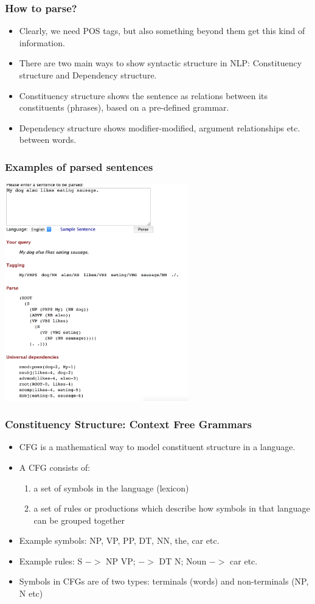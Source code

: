 \documentclass{beamer}
\begin{document}
\begin{frame}
\frametitle{How to parse?}
\begin{itemize}
\item Clearly, we need POS tags, but also something beyond them get this kind of information. 
\item There are two main ways to show syntactic structure in NLP: Constituency structure and Dependency structure. 
\item Constituency structure shows the sentence as relations between its constituents (phrases), based on a pre-defined grammar.
\item Dependency structure shows modifier-modified, argument relationships etc. between words. 
\end{itemize}
\end{frame}

\begin{frame}
\frametitle{Examples of parsed sentences}
\includegraphics[width=0.6\textwidth]{parses-examples.png}
\end{frame}

\begin{frame}
\frametitle{Constituency Structure: Context Free Grammars}
\begin{itemize}
\item CFG is a mathematical way to model constituent structure in a language. 
\item A CFG consists of:
\begin{enumerate}
\item a set of symbols in the language (lexicon)
\item a set of rules or productions which describe how symbols in that language can be grouped together
\end{enumerate} \pause
\item Example symbols: NP, VP, PP, DT, NN, the, car etc.
\item Example rules: S $->$ NP VP; $->$ DT N; Noun $->$ car etc.
\item Symbols in CFGs are of two types: terminals (words) and non-terminals (NP, N etc)
\end{itemize}
\end{frame}
\end{document}
